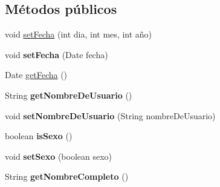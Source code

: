 \subsection*{Métodos públicos}
\begin{DoxyCompactItemize}
\item 
void \hyperlink{classcom_1_1ucab_1_1javachat_1_1_cliente_1_1model_1_1_usuario_a962413eaf8392fb0bbf4c258791c2f81}{set\-Fecha} (int dia, int mes, int año)
\item 
\hypertarget{classcom_1_1ucab_1_1javachat_1_1_cliente_1_1model_1_1_usuario_a5f180af92da2cde84e9762a13f1dcedc}{void {\bfseries set\-Fecha} (Date fecha)}\label{classcom_1_1ucab_1_1javachat_1_1_cliente_1_1model_1_1_usuario_a5f180af92da2cde84e9762a13f1dcedc}

\item 
Date \hyperlink{classcom_1_1ucab_1_1javachat_1_1_cliente_1_1model_1_1_usuario_ad255edbcac5585116c65773022df0f02}{get\-Fecha} ()
\item 
\hypertarget{classcom_1_1ucab_1_1javachat_1_1_cliente_1_1model_1_1_usuario_a139d7d4ca4b1a37cb45b8ae6feaab09b}{String {\bfseries get\-Nombre\-De\-Usuario} ()}\label{classcom_1_1ucab_1_1javachat_1_1_cliente_1_1model_1_1_usuario_a139d7d4ca4b1a37cb45b8ae6feaab09b}

\item 
\hypertarget{classcom_1_1ucab_1_1javachat_1_1_cliente_1_1model_1_1_usuario_a7bc835c87e85911fd7532630bc526303}{void {\bfseries set\-Nombre\-De\-Usuario} (String nombre\-De\-Usuario)}\label{classcom_1_1ucab_1_1javachat_1_1_cliente_1_1model_1_1_usuario_a7bc835c87e85911fd7532630bc526303}

\item 
\hypertarget{classcom_1_1ucab_1_1javachat_1_1_cliente_1_1model_1_1_usuario_a2a326a5856e7cd7bcb72b49850657bfd}{boolean {\bfseries is\-Sexo} ()}\label{classcom_1_1ucab_1_1javachat_1_1_cliente_1_1model_1_1_usuario_a2a326a5856e7cd7bcb72b49850657bfd}

\item 
\hypertarget{classcom_1_1ucab_1_1javachat_1_1_cliente_1_1model_1_1_usuario_ad94a088891efdf5ff68fc768187d124a}{void {\bfseries set\-Sexo} (boolean sexo)}\label{classcom_1_1ucab_1_1javachat_1_1_cliente_1_1model_1_1_usuario_ad94a088891efdf5ff68fc768187d124a}

\item 
\hypertarget{classcom_1_1ucab_1_1javachat_1_1_cliente_1_1model_1_1_usuario_a56373f03d2014179ecbaec38601c9247}{String {\bfseries get\-Nombre\-Completo} ()}\label{classcom_1_1ucab_1_1javachat_1_1_cliente_1_1model_1_1_usuario_a56373f03d2014179ecbaec38601c9247}


\end{DoxyCompactItemize}
